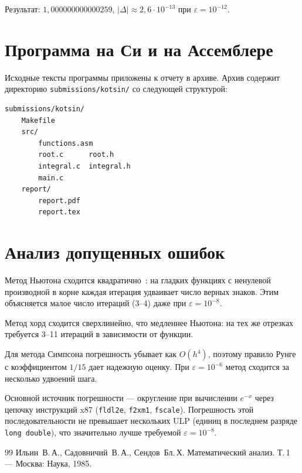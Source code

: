 \documentclass[a4paper,12pt,titlepage,finall]{article}
\begin{document}
Результат: $1{,}000000000000259$, $|\Delta| \approx 2{,}6 \cdot 10^{-13}$ при $\varepsilon = 10^{-12}$.

\newpage

\section{Программа на Си и на Ассемблере}

Исходные тексты программы приложены к отчету в архиве.
Архив содержит директорию \texttt{submissions/kotsin/} со следующей структурой:

\begin{lstlisting}
submissions/kotsin/
    Makefile
    src/
        functions.asm
        root.c      root.h
        integral.c  integral.h
        main.c
    report/
        report.pdf
        report.tex
\end{lstlisting}

\newpage

\section{Анализ допущенных ошибок}

Метод Ньютона сходится квадратично~\cite{math}: на гладких функциях с ненулевой
производной в корне каждая итерация удваивает число верных знаков.
Этим объясняется малое число итераций (3--4) даже при $\varepsilon = 10^{-8}$.

Метод хорд сходится сверхлинейно, что медленнее Ньютона: на тех же отрезках
требуется 3--11 итераций в зависимости от функции.

Для метода Симпсона погрешность убывает как $O(h^4)$, поэтому
правило Рунге с коэффициентом $1/15$ дает надежную оценку.
При $\varepsilon = 10^{-6}$ метод сходится за несколько удвоений шага.

Основной источник погрешности --- округление при вычислении $e^{-x}$
через цепочку инструкций x87 (\texttt{fldl2e}, \texttt{f2xm1}, \texttt{fscale}).
Погрешность этой последовательности не превышает нескольких ULP (единиц в
последнем разряде \texttt{long double}), что значительно лучше требуемой $\varepsilon = 10^{-8}$.

\newpage
\begin{raggedright}
\begin{thebibliography}{99}
 Ильин~В.\,А., Садовничий~В.\,А., Сендов~Бл.\,Х.
    Математический анализ. Т.\,1 ---
    Москва: Наука, 1985.
\end{thebibliography}
\end{raggedright}
\end{document}
